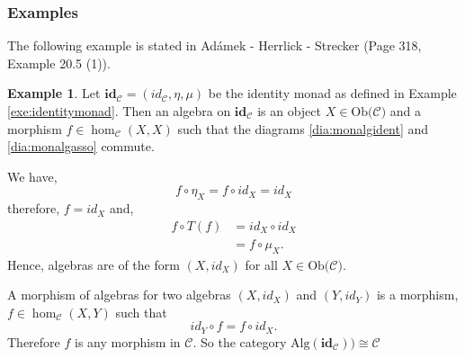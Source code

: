 \documentclass[11pt,a4paper]{article}
\theoremstyle{definition}
\newtheorem{example}[thm]{Example}
\newcommand\ho[3][]{\hom_{#1}(#2,#3)}
\newcommand\ob[1]{\mathrm{Ob(}#1\mathrm{)}}
\newcommand\cat[1]{\mathscr{#1}}
\newcommand{\alg}[1]{\mathrm{Alg}(\mathbf{#1})}
\numberwithin{equation}{section}
\begin{document}
\subsubsection{Examples}
\label{sss:exealgemon}
The following example is stated in Adámek - Herrlick - Strecker \cite{ACC} (Page 318, Example 20.5 (1)).
\begin{example}
    Let $\mathbf{id_{\cat{C}}} = (id_{\cat{C}},\eta,\mu)$ be the identity monad as defined in Example \ref{exe:identitymonad}. Then an algebra on $\mathbf{id_{\cat{C}}}$ is an object $X\in\ob{\cat{C}}$ and a morphism $f\in\ho[\cat{C}]{X}{X}$ such that the diagrams \eqref{dia:monalgident} and \eqref{dia:monalgasso} commute. 
    
    We have,
   \[f\circ \eta_X = f\circ id_{X}= id_{X}\]
   therefore, $f = id_{X}$ and,
   \begin{align*}
   f\circ T(f) &= id_{X} \circ id_{X} \\
   &= f\circ \mu_{X}.
   \end{align*}
   Hence, algebras are of the form $(X,id_{X})$ for all $X\in\ob{\cat{C}}$. 
   
   A morphism of algebras for two algebras $(X,id_{X})$ and $(Y,id_{Y})$ is a morphism, $f\in\ho[\cat{C}]{X}{Y}$ such that \[id_{Y}\circ f = f\circ id_{X}.\] Therefore $f$ is any morphism in $\cat{C}$. So the category $\alg{id_{\cat{C}}}) \cong \cat{C}$ 
\end{example}
\end{document}
